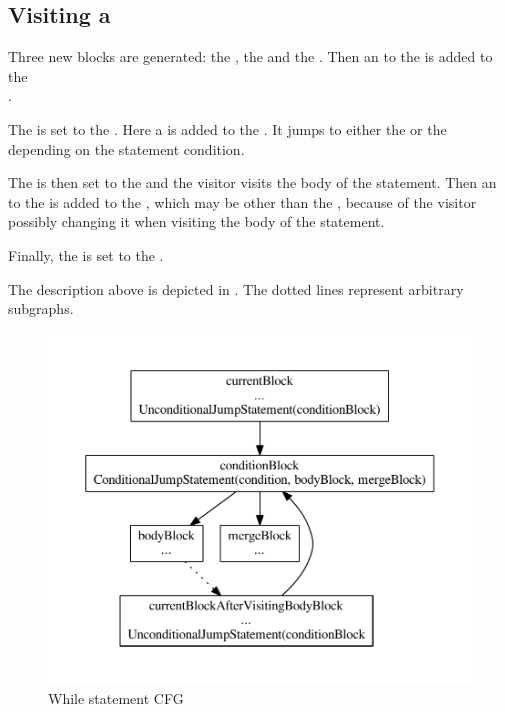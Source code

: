\subsection{Visiting a }

Three new blocks are generated: the , the  and the . Then an
 to the  is added to the\\
.

The  is set to the . Here a  is added to the
. It jumps to either the  or the  depending on the 
statement condition.

The  is then set to the  and the visitor visits the body of the 
statement. Then an  to the  is added to the ,
which may be other than the , because of the visitor possibly changing it when visiting the body of the
 statement.

Finally, the  is set to the .

The description above is depicted in . The dotted lines represent arbitrary subgraphs.

\begin{figure}
    \centering
    \includegraphics[width=\textwidth]{src/graph/while.pdf}
    \caption{While statement CFG\label{img:while-statement}}
\end{figure}